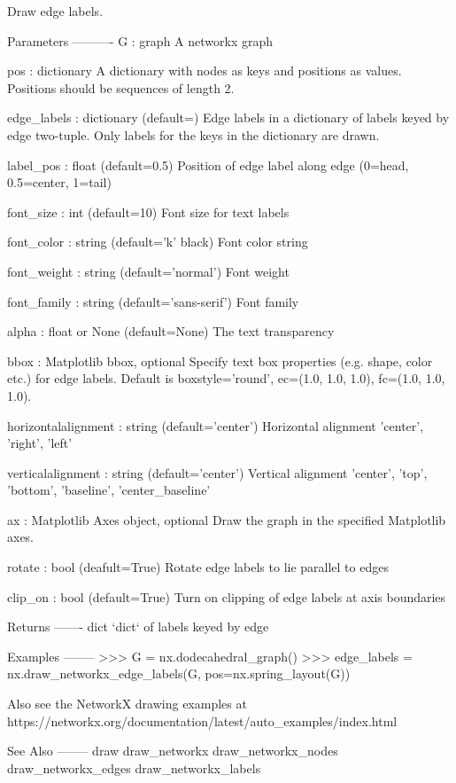 \begin{DoxyVerb}Draw edge labels.

Parameters
----------
G : graph
    A networkx graph

pos : dictionary
    A dictionary with nodes as keys and positions as values.
    Positions should be sequences of length 2.

edge_labels : dictionary (default={})
    Edge labels in a dictionary of labels keyed by edge two-tuple.
    Only labels for the keys in the dictionary are drawn.

label_pos : float (default=0.5)
    Position of edge label along edge (0=head, 0.5=center, 1=tail)

font_size : int (default=10)
    Font size for text labels

font_color : string (default='k' black)
    Font color string

font_weight : string (default='normal')
    Font weight

font_family : string (default='sans-serif')
    Font family

alpha : float or None (default=None)
    The text transparency

bbox : Matplotlib bbox, optional
    Specify text box properties (e.g. shape, color etc.) for edge labels.
    Default is {boxstyle='round', ec=(1.0, 1.0, 1.0), fc=(1.0, 1.0, 1.0)}.

horizontalalignment : string (default='center')
    Horizontal alignment {'center', 'right', 'left'}

verticalalignment : string (default='center')
    Vertical alignment {'center', 'top', 'bottom', 'baseline', 'center_baseline'}

ax : Matplotlib Axes object, optional
    Draw the graph in the specified Matplotlib axes.

rotate : bool (deafult=True)
    Rotate edge labels to lie parallel to edges

clip_on : bool (default=True)
    Turn on clipping of edge labels at axis boundaries

Returns
-------
dict
    `dict` of labels keyed by edge

Examples
--------
>>> G = nx.dodecahedral_graph()
>>> edge_labels = nx.draw_networkx_edge_labels(G, pos=nx.spring_layout(G))

Also see the NetworkX drawing examples at
https://networkx.org/documentation/latest/auto_examples/index.html

See Also
--------
draw
draw_networkx
draw_networkx_nodes
draw_networkx_edges
draw_networkx_labels
\end{DoxyVerb}
 \mbox{\label{namespacenetworkx_1_1drawing_1_1nx__pylab_a4cb9e85a2799e28ec7e0dc97a400ba9b}} 
